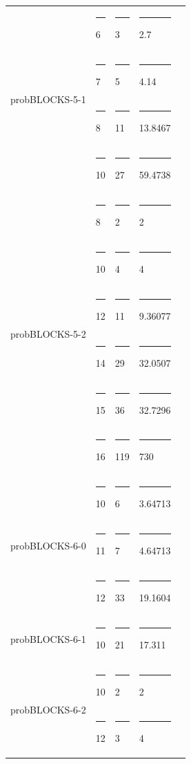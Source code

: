 \documentclass[11pt,a4paper,oneside]{report}
\begin{document}
\begin{longtable}{@{\extracolsep{\fill}} lllll @{}}
\multirow{4}{*}{probBLOCKS-5-1} &\rule{4pt}{0ex} 6         &\rule{4pt}{0ex} 3                &\rule{4pt}{0ex} 2.7         \\ \cline{2-4}
							   &\rule{4pt}{0ex} 7         &\rule{4pt}{0ex} 5                &\rule{4pt}{0ex} 4.14     \\ \cline{2-4}
							   &\rule{4pt}{0ex} 8         &\rule{4pt}{0ex} 11               &\rule{4pt}{0ex} 13.8467      \\ \cline{2-4}
							   &\rule{4pt}{0ex} 10        &\rule{4pt}{0ex} 27               &\rule{4pt}{0ex} 59.4738     \\ \hline
\multirow{6}{*}{probBLOCKS-5-2} &\rule{4pt}{0ex} 8         &\rule{4pt}{0ex} 2                &\rule{4pt}{0ex} 2          \\ \cline{2-4}
                                &\rule{4pt}{0ex} 10        &\rule{4pt}{0ex} 4                &\rule{4pt}{0ex} 4          \\ \cline{2-4}
                                &\rule{4pt}{0ex} 12        &\rule{4pt}{0ex} 11               &\rule{4pt}{0ex} 9.36077     \\ \cline{2-4}
                                &\rule{4pt}{0ex} 14        &\rule{4pt}{0ex} 29               &\rule{4pt}{0ex} 32.0507     \\ \cline{2-4}
                                &\rule{4pt}{0ex} 15        &\rule{4pt}{0ex} 36               &\rule{4pt}{0ex} 32.7296     \\ \cline{2-4}
                                &\rule{4pt}{0ex} 16        &\rule{4pt}{0ex} 119              &\rule{4pt}{0ex} 730         \\ \hline
\multirow{3}{*}{probBLOCKS-6-0} &\rule{4pt}{0ex} 10        &\rule{4pt}{0ex} 6                &\rule{4pt}{0ex} 3.64713   \\ \cline{2-4}
							    &\rule{4pt}{0ex} 11       &\rule{4pt}{0ex} 7                &\rule{4pt}{0ex} 4.64713   \\ \cline{2-4}
								&\rule{4pt}{0ex} 12       &\rule{4pt}{0ex} 33               &\rule{4pt}{0ex} 19.1604    \\ \hline
probBLOCKS-6-1                  &\rule{4pt}{0ex} 10        &\rule{4pt}{0ex} 21               &\rule{4pt}{0ex} 17.311    \\ \hline
\multirow{10}{*}{probBLOCKS-6-2}&\rule{4pt}{0ex} 10        &\rule{4pt}{0ex} 2               &\rule{4pt}{0ex} 2          \\ \cline{2-4} 
                                &\rule{4pt}{0ex} 12        &\rule{4pt}{0ex} 3               &\rule{4pt}{0ex} 4     \\ \cline{2-4}

\end{longtable}
\end{document}
